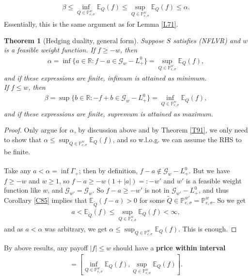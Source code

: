 \documentclass[12pt,a4paper, twoside]{article}
\newtheorem{thm}{Theorem}[section]
\theoremstyle{definition}
\newcommand{\EE}{\mathbb{E}} %
\newcommand{\PP}{\mathbb{P}} %
\begin{document}
\begin{align*}
\beta \leq \inf_{Q \in \PP_{e, \sigma}^w} \EE_Q(f) \leq \sup_{Q \in \PP_{e, \sigma}^w}\EE_Q(f) \leq \alpha.
\end{align*}
Essentially, this is the same argument as for Lemma \ref{L71}. 
\begin{thm}[Hedging duality, general form] Suppose $S$ satisfies (NFLVR) and $w$ is a feasible weight function. If $f \geq -w$, then 
\begin{align*} \label{91}
\alpha = \inf \{ a \in \mathbb{R}: f-a \in \mathcal{G}_w-L_+^0 \} = \sup_{Q \in \PP_{e, \sigma}^w} \EE_Q(f), \tag{9.1}
\end{align*}
and if these expressions are finite, infimum is attained as minimum. \\
If $f \leq w$, then 
\begin{align*}
\beta = \sup\{ b \in \mathbb{R}: -f+b \in \mathcal{G}_w-L_+^0\} = \inf_{Q \in \PP_{e, \sigma}^w} \EE_Q(f),
\end{align*}
and if these expressions are finite, supremum is attained as maximum. 
\end{thm}
\begin{proof}
Only argue for $\alpha$, by discussion above and by Theorem \ref{T91}, we only need to show that $\alpha \leq \sup_{Q \in \PP_{e,  \sigma}^w} \EE_Q(f)$, and so w.l.o.g. we can assume the RHS to be finite. \\
\\
Take any $a< \alpha = \inf \Gamma_+$; then by definition, $f-a \notin \mathcal{G}_w-L_+^0$. But we have $f \geq -w$ and $w \geq 1$, so $f-a \geq -w(1+|a|)=:-w'$ and $w'$ is a feasible weight function like $w$, and $\mathcal{G}_{w'}= \mathcal{G}_{w}$. So $f-a \geq -w' $ is not in $\mathcal{G}_{w'}-L_+^0$, and thus Corollary \ref{C85} implies that $\EE_{\widetilde{Q}}(f-a) >0$ for some $\widetilde{Q} \in \PP_{e, \sigma}^{w'} = \PP_{e, \sigma}^w$. So we get 
\begin{align*}
a < \EE_{ \widetilde{Q}}(f) \leq \sup_{Q \in \PP_{e, \sigma}^w } \EE_Q(f) < \infty,
\end{align*}
and as $a < \alpha$ was arbitrary, we get $\alpha \leq \sup_{Q \in \PP_{e, \sigma}^w} \EE_Q(f)$. This is enough. 
\end{proof}
By above results, any payoff $|f| \leq w$ should have a \textbf{price within interval}
\begin{align*}
[\beta, \alpha ] = \left[  \inf_{Q \in \PP_{e, \sigma}^w} \EE_Q(f), \sup_{Q \in \PP_{e, \sigma}^w } \EE_Q(f) \right].
\end{align*} 
\end{document}
